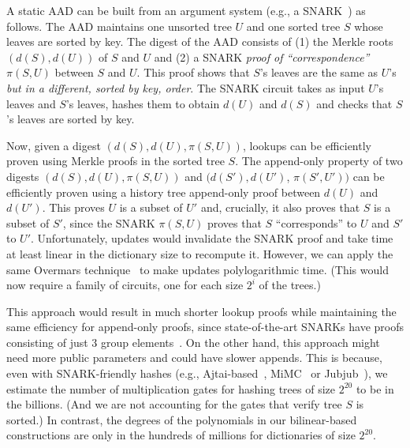 A static AAD can be built from an argument system (e.g., a SNARK~\cite{groth16,qsp}) as follows.
The AAD maintains one unsorted tree $U$ and one sorted tree $S$ whose leaves are sorted by key. 
The digest of the AAD consists of (1) the Merkle roots $(d(S), d(U))$ of $S$ and $U$ and (2) a SNARK \textit{proof of ``correspondence''} $\pi(S,U)$  between $S$ and $U$.
This proof shows that $S$'s leaves are the same as $U$'s \textit{but in a different, sorted by key, order}.
The SNARK circuit takes as input $U$'s leaves and $S$'s leaves, hashes them to obtain $d(U)$ and $d(S)$ and checks that $S$'s leaves are sorted by key.

Now, given a digest $(d(S), d(U), \pi(S,U))$, lookups can be efficiently proven using Merkle proofs in the sorted tree $S$.
The append-only property of two digests $(d(S), d(U), \pi(S,U))$ and $(d(S'), d(U')$, $\pi(S',U'))$ can be efficiently proven using a history tree append-only proof between $d(U)$ and $d(U')$. 
This proves $U$ is a subset of $U'$ and, crucially, it also proves that $S$ is a subset of $S'$, since the SNARK $\pi(S,U)$ proves that $S$ ``corresponds'' to $U$ and $S'$ to $U'$.
Unfortunately, updates would invalidate the SNARK proof and take time at least linear in the dictionary size to recompute it.
However, we can apply the same Overmars technique~\cite{overmars,overmars-van-leeuwen} to make updates polylogarithmic time.
(This would now require a family of circuits, one for each size $2^i$ of the trees.)

This approach would result in much shorter lookup proofs while maintaining the same efficiency for append-only proofs, since state-of-the-art SNARKs have proofs consisting of just 3 group elements~\cite{groth16}.
On the other hand, this approach might need more public parameters and could have slower appends.
This is because, even with SNARK-friendly hashes (e.g., Ajtai-based~\cite{cycles-of-ec}, MiMC~\cite{mimc} or Jubjub~\cite{jubjub}), we estimate the number of multiplication gates for hashing trees of size $2^{20}$ to be in the billions.
(And we are not accounting for the gates that verify tree $S$ is sorted.)
In contrast, the degrees of the polynomials in our bilinear-based constructions are only in the hundreds of millions for dictionaries of size $2^{20}$.

